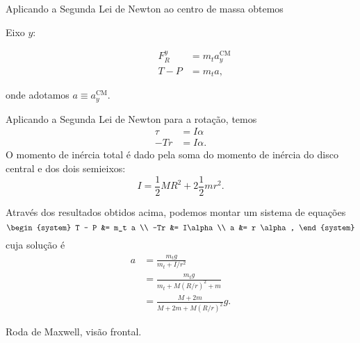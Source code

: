 Aplicando a Segunda Lei de Newton ao centro de massa obtemos
\begin{description}
\item[Eixo $y$:]
\begin{align}
    F_R^y &= m_t a_y^{\text{CM}} \\
    T - P &= m_t a,
\end{align}
\end{description}
%
onde adotamos $a \equiv a_y^{\text{CM}}$.

Aplicando a Segunda Lei de Newton para a rotação, temos
\begin{align}
    \tau &= I\alpha \\
    -Tr &= I\alpha.
\end{align}
%
O momento de inércia total é dado pela soma do momento de inércia do disco central e dos dois semieixos:
\begin{equation}
    I = \frac{1}{2} MR^2 + 2\frac{1}{2} m r^2.
\end{equation}

Através dos resultados obtidos acima, podemos montar um sistema de equações
\begin{equation}
\begin{system}
    T - P &= m_t a \\
    -Tr &= I\alpha \\
    a &= r \alpha,
\end{system}
\end{equation}
%
cuja solução é
\begin{align}
    a &= \frac{m_t g}{m_t + I / r^2} \\
    &= \frac{m_tg}{m_t + M(R/r)^2 + m} \\
    &= \frac{M + 2m}{M + 2m + M(R/r)^2} g.
\end{align}

\begin{marginfigure}[1.5cm]
\centering
{}
\caption{Roda de Maxwell, visão frontal.\label{Fig:RodaDeMaxwellVisaoFrontal}}
\end{marginfigure}

